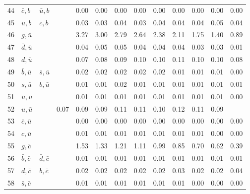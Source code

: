 \begin{tabularx}{\textwidth}{rXXX@{}S@{}S@{}S@{}S@{}S@{}S@{}S@{}S@{}S}
 44 & $\bar c, b$      & $\bar u, b$       &                  &  0.00 &  0.00 &  0.00 &  0.00 &  0.00 &  0.00 &  0.00 &  0.00 &  0.00 \\
 45 & $u, b$           & $c, b$            &                  &  0.03 &  0.03 &  0.04 &  0.03 &  0.04 &  0.04 &  0.04 &  0.05 &  0.04 \\
 46 & $g, \bar u$      &                   &                  &  3.27 &  3.00 &  2.79 &  2.64 &  2.38 &  2.11 &  1.75 &  1.40 &  0.89 \\
 47 & $\bar d, \bar u$ &                   &                  &  0.04 &  0.05 &  0.05 &  0.04 &  0.04 &  0.04 &  0.03 &  0.03 &  0.01 \\
 48 & $d, \bar u$      &                   &                  &  0.07 &  0.08 &  0.09 &  0.10 &  0.10 &  0.11 &  0.10 &  0.10 &  0.08 \\
 49 & $\bar b, \bar u$ & $\bar s, \bar u$  &                  &  0.02 &  0.02 &  0.02 &  0.02 &  0.02 &  0.01 &  0.01 &  0.01 &  0.00 \\
 50 & $s, \bar u$      & $b, \bar u$       &                  &  0.01 &  0.01 &  0.02 &  0.01 &  0.01 &  0.01 &  0.01 &  0.01 &  0.01 \\
 51 & $\bar u, \bar u$ &                   &                  &  0.01 &  0.01 &  0.01 &  0.01 &  0.01 &  0.01 &  0.01 &  0.01 &  0.00 \\
 52 & $u, \bar u$                          &                  &  0.07 &  0.09 &  0.09 &  0.11 &  0.11 &  0.10 &  0.12 &  0.11 &  0.09 \\
 53 & $\bar c, \bar u$ &                   &                  &  0.00 &  0.00 &  0.00 &  0.00 &  0.00 &  0.00 &  0.00 &  0.00 &  0.00 \\
 54 & $c, \bar u$      &                   &                  &  0.01 &  0.01 &  0.01 &  0.01 &  0.01 &  0.01 &  0.01 &  0.00 &  0.00 \\
 55 & $g, \bar c$      &                   &                  &  1.53 &  1.33 &  1.21 &  1.11 &  0.99 &  0.85 &  0.70 &  0.62 &  0.39 \\
 56 & $\bar b, \bar c$ & $\bar d, \bar c$  &                  &  0.01 &  0.01 &  0.01 &  0.01 &  0.01 &  0.01 &  0.01 &  0.01 &  0.01 \\
 57 & $d, \bar c$      & $b, \bar c$       &                  &  0.02 &  0.02 &  0.02 &  0.02 &  0.02 &  0.03 &  0.02 &  0.02 &  0.04 \\
 58 & $\bar s, \bar c$ &                   &                  &  0.01 &  0.01 &  0.01 &  0.01 &  0.01 &  0.01 &  0.00 &  0.00 &  0.00 \\

\end{tabularx}
